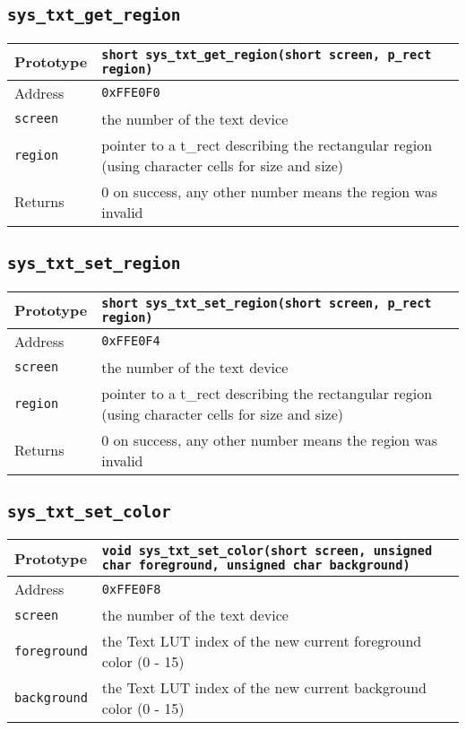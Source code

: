 \subsection*{\texttt{sys\_txt\_get\_region}}
\begin{tabular}{|l||l|} \hline
Prototype & \lstinline!short sys_txt_get_region(short screen, p_rect region)! \\ \hline
Address & \texttt{0xFFE0F0} \\ \hline
\lstinline!screen! & the number of the text device \\ \hline
\lstinline!region! & pointer to a t\_rect describing the rectangular region (using character cells for size and size) \\ \hline
Returns & 0 on success, any other number means the region was invalid \\ \hline
\end{tabular}

\subsection*{\texttt{sys\_txt\_set\_region}}
\begin{tabular}{|l||l|} \hline
Prototype & \lstinline!short sys_txt_set_region(short screen, p_rect region)! \\ \hline
Address & \texttt{0xFFE0F4} \\ \hline
\lstinline!screen! & the number of the text device \\ \hline
\lstinline!region! & pointer to a t\_rect describing the rectangular region (using character cells for size and size) \\ \hline
Returns & 0 on success, any other number means the region was invalid \\ \hline
\end{tabular}

\subsection*{\texttt{sys\_txt\_set\_color}}
\begin{tabular}{|l||l|} \hline
Prototype & \lstinline!void sys_txt_set_color(short screen, unsigned char foreground, unsigned char background)! \\ \hline
Address & \texttt{0xFFE0F8} \\ \hline
\lstinline!screen! & the number of the text device \\ \hline
\lstinline!foreground! & the Text LUT index of the new current foreground color (0 - 15) \\ \hline
\lstinline!background! & the Text LUT index of the new current background color (0 - 15) \\ \hline
\end{tabular}

